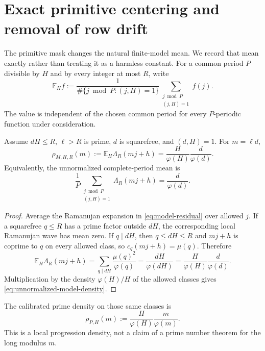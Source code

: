 \section{Exact primitive centering and removal of row drift}
\label{sec:centering}

The primitive mask changes the natural finite-model mean.  We record
that mean exactly rather than treating it as a harmless constant.
For a common period \(P\) divisible by \(H\) and by every integer at
most \(R\), write
\begin{equation}
 \mathbb E_H f
 :=\frac{1}{\#\{j\bmod P:(j,H)=1\}}
 \sum_{\substack{j\bmod P\\(j,H)=1}}f(j).
 \label{eq:conditional-average}
\end{equation}
The value is independent of the chosen common period for every
\(P\)-periodic function under consideration.

\begin{lemma}
\label{lem:model-conditional-mean}
Assume \(dH\le R\), \(\ell>R\) is prime, \(d\) is squarefree, and
\((d,H)=1\).  For \(m=\ell d\),
\begin{equation}
 \rho_{M,H,R}(m)
 :=\mathbb E_H\Lambda_R(mj+h)
 =\frac{H}{\varphi(H)}\frac d{\varphi(d)}.
 \label{eq:model-density}
\end{equation}
Equivalently, the unnormalized complete-period mean is
\begin{equation}
 \frac1P\sum_{\substack{j\bmod P\\(j,H)=1}}
 \Lambda_R(mj+h)=\frac d{\varphi(d)}.
 \label{eq:unnormalized-model-density}
\end{equation}
\end{lemma}

\begin{proof}
Average the Ramanujan expansion in \eqref{eq:model-residual} over
allowed \(j\).  If a squarefree \(q\le R\) has a prime factor outside
\(dH\), the corresponding local Ramanujan wave has mean zero.  If
\(q\mid dH\), then \(q\le dH\le R\) and \(mj+h\) is coprime to \(q\)
on every allowed class, so \(c_q(mj+h)=\mu(q)\).  Therefore
\[
 \mathbb E_H\Lambda_R(mj+h)
 =\sum_{q\mid dH}\frac{\mu(q)^2}{\varphi(q)}
 =\frac{dH}{\varphi(dH)}
 =\frac{H}{\varphi(H)}\frac d{\varphi(d)}.
\]
Multiplication by the density \(\varphi(H)/H\) of the allowed classes
gives \eqref{eq:unnormalized-model-density}.
\end{proof}

The calibrated prime density on those same classes is
\begin{equation}
 \rho_{P,H}(m)
 :=\frac{H}{\varphi(H)}\frac m{\varphi(m)}.
 \label{eq:prime-density}
\end{equation}
This is a local progression density, not a claim of a prime number
theorem for the long modulus \(m\).

